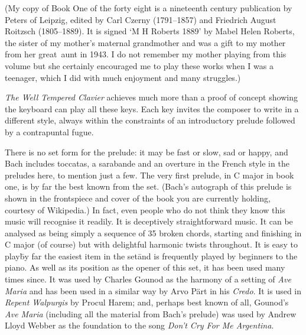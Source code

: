 (My copy of Book One of the forty eight is a nineteenth century
publication by Peters of Leipzig, edited by Carl Czerny (1791--1857)
and Friedrich August Roitzsch (1805--1889).  It is signed `M H Roberts
1889' by Mabel Helen Roberts, the sister of my mother's maternal
grandmother and was a gift to my mother from her great~aunt in 1943.
I do not remember my mother playing from this volume but she certainly
encouraged me to play these works when I was a teenager, which I did with
much enjoyment and many struggles.)

\textit{The Well Tempered Clavier} achieves much more than
a proof of concept showing the keyboard can play all these keys.
Each key invites the composer to write in a different style, always
within the constraints of an introductory prelude followed by a
contrapuntal fugue.

There is no set form for the prelude: it may be fast or slow, sad or
happy, and Bach includes toccatas, a sarabande and an overture in the
French style in the preludes here, to mention just a few.
The very first prelude, in C major in book one, is by far the best
known from the set. (Bach's autograph of this prelude is shown in the
frontspiece and cover of the book you are currently holding, courtesy of Wikipedia.)
In fact, even people who do not think they know
this music will recognise it readily. It is deceptively
straightforward music.  It can be analysed as being simply a sequence
of 35 broken chords, starting and finishing in C major (of course) but
with delightful harmonic twists throughout.  It is easy to play\=by
far the easiest item in the set\=and is frequently played by beginners
to the piano.  As well as its position as the opener of this set, it
has been used many times since.  It was used by Charles Gounod as the
harmony of a setting of \textit{Ave Maria} and has been used in a
similar way by Arvo Pärt in his \textit{Credo}.  It is used
in \textit{Repent Walpurgis} by Procul Harem; and, perhaps best known
of all, Gounod's \textit{Ave Maria} (including all the material from
Bach's prelude) was used by Andrew Lloyd Webber as the foundation to
the song \textit{Don't Cry For Me Argentina}.

